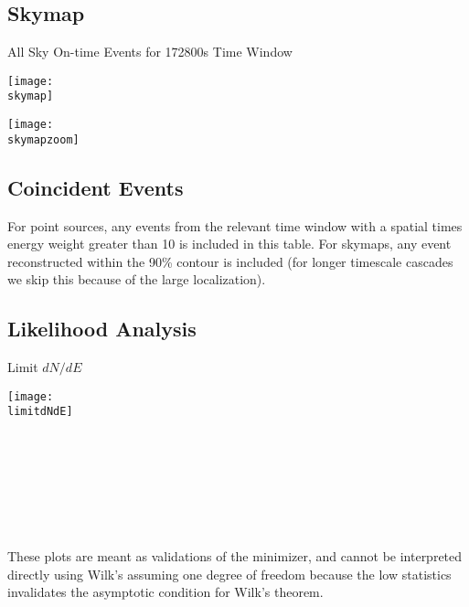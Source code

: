 \documentclass[titlepage]{article}
\begin{document}
%
%
%
%
%
%
%

\pagebreak
\subsection{Skymap}

{
  \centering
  {\Large All Sky On-time Events for 172800s Time Window}

  \texttt{[image: \\skymap]}

  \texttt{[image: \\skymapzoom]}

}
\pagebreak

\subsection{Coincident Events}
For point sources, any events from the relevant time window with a spatial times energy weight greater than 10 is included in this table. For skymaps, any event reconstructed within the 90\% contour is included (for longer timescale cascades we skip this because of the large localization).
\event

\subsection{Likelihood Analysis}
\results
\pagebreak

\backgroundpdfplot

\survivialfunctionplot

\pagebreak
{
  \centering

  {\Large Limit $dN/dE$}

  \texttt{[image: \\limitdNdE]}
  \\
  \\

  \tsd

  \\
  \\
  \upperlim

  \\
  \\
  \nsscan

  These plots are meant as validations of the minimizer, and cannot be interpreted directly using Wilk's assuming one degree of freedom because the low statistics invalidates the asymptotic condition for Wilk's theorem.
}
\end{document}
